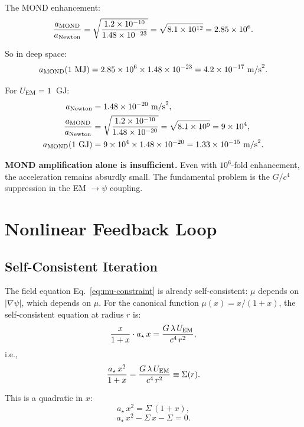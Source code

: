 \documentclass[aps,prd,twocolumn,superscriptaddress,nofootinbib]{revtex4-2}
\newcommand{\astar}{a_\star}
\newcommand{\ee}[1]{\times 10^{#1}}
\newcommand{\lam}{\lambda}
\begin{document}
The MOND enhancement:
\begin{equation}
\frac{a_{\rm MOND}}{a_{\rm Newton}} = \sqrt{\frac{1.2\ee{-10}}{1.48\ee{-23}}}
= \sqrt{8.1\ee{12}} = 2.85\ee{6}.
\end{equation}

So in deep space:
\begin{equation}
a_{\rm MOND}(1\text{ MJ}) = 2.85\ee{6} \times 1.48\ee{-23}
= 4.2\ee{-17}~\text{m/s}^2.
\end{equation}

For $U_{\rm EM} = 1$~GJ:
\begin{align}
a_{\rm Newton} &= 1.48\ee{-20}~\text{m/s}^2, \\
\frac{a_{\rm MOND}}{a_{\rm Newton}} &= \sqrt{\frac{1.2\ee{-10}}{1.48\ee{-20}}}
= \sqrt{8.1\ee{9}} = 9\ee{4}, \\
a_{\rm MOND}(1\text{ GJ}) &= 9\ee{4}\times 1.48\ee{-20}
= 1.33\ee{-15}~\text{m/s}^2.
\end{align}

\textbf{MOND amplification alone is insufficient.}  Even with $10^6$-fold
enhancement, the acceleration remains absurdly small.  The fundamental
problem is the $G/c^4$ suppression in the EM $\to \psi$ coupling.


\section{Nonlinear Feedback Loop}\label{sec:feedback}

\subsection{Self-Consistent Iteration}

The field equation Eq.~\eqref{eq:mu-constraint} is already
self-consistent: $\mu$ depends on $|\nabla\psi|$, which depends on
$\mu$.  For the canonical function $\mu(x) = x/(1+x)$, the
self-consistent equation at radius $r$ is:
\begin{equation}
\frac{x}{1+x}\cdot \astar\,x = \frac{G\,\lam\,U_{\rm EM}}{c^4\,r^2},
\end{equation}
i.e.,
\begin{equation}
\frac{\astar\,x^2}{1+x} = \frac{G\,\lam\,U_{\rm EM}}{c^4\,r^2}
\equiv \Sigma(r).
\end{equation}

This is a quadratic in $x$:
\begin{equation}
\astar\,x^2 = \Sigma\,(1+x),
\end{equation}
\begin{equation}
\astar\,x^2 - \Sigma\,x - \Sigma = 0.
\end{equation}
\end{document}
